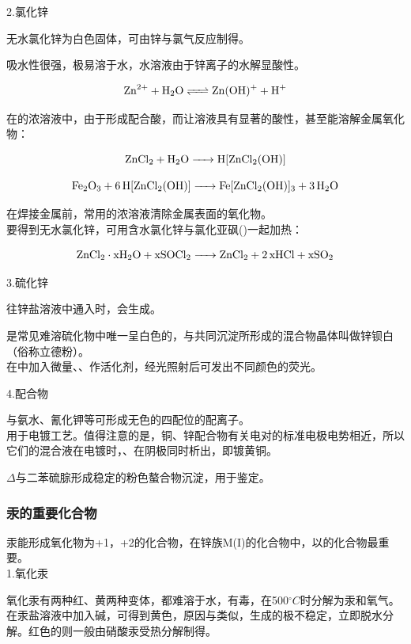 \documentclass[a4paper,UTF8]{article}
\begin{document}
2.氯化锌

无水氯化锌为白色固体，可由锌与氯气反应制得。

吸水性很强，极易溶于水，水溶液由于锌离子的水解显酸性。

$$ \ce{Zn^{2+} + H2O <=> Zn(OH)+ + H+} $$

在的浓溶液中，由于形成配合酸，而让溶液具有显著的酸性，甚至能溶解金属氧化物：

$$ \ce{ZnCl2 + H2O -> H[ZnCl2(OH)]} $$

$$ \ce{Fe2O3 + 6H[ZnCl2(OH)] -> Fe[ZnCl2(OH)]3 + 3H2O} $$

在焊接金属前，常用的浓溶液清除金属表面的氧化物。\\

要得到无水氯化锌，可用含水氯化锌与氯化亚砜()一起加热：

$$ \ce{ZnCl2\cdot xH2O + xSOCl2 -> ZnCl2 + 2xHCl + xSO2} $$

3.硫化锌

往锌盐溶液中通入时，会生成。

是常见难溶硫化物中唯一呈白色的，与共同沉淀所形成的混合物晶体叫做锌钡白（俗称立德粉）。\\

在中加入微量、、作活化剂，经光照射后可发出不同颜色的荧光。

4.配合物

与氨水、氰化钾等可形成无色的四配位的配离子。\\

用于电镀工艺。值得注意的是，铜、锌配合物有关电对的标准电极电势相近，所以它们的混合液在电镀时，、在阴极同时析出，即镀黄铜。

$\Delta$与二苯硫腙形成稳定的粉色螯合物沉淀，用于鉴定。

\subsubsection{汞的重要化合物}

汞能形成氧化物为+1，+2的化合物，在锌族M(I)的化合物中，以的化合物最重要。\\

1.氧化汞

氧化汞有两种红、黄两种变体，都难溶于水，有毒，在500$^\circ C$时分解为汞和氧气。在汞盐溶液中加入碱，可得到黄色，原因与类似，生成的极不稳定，立即脱水分解。红色的则一般由硝酸汞受热分解制得。
\end{document}
